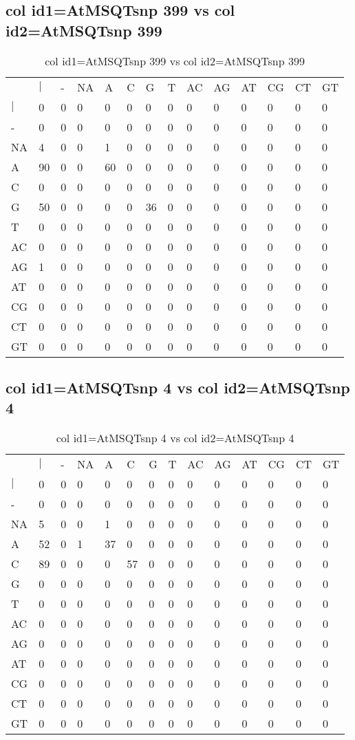 \subsection{col id1=AtMSQTsnp 399 vs col id2=AtMSQTsnp 399}
\begin{center}
\begin{longtable}{|l|l|l|l|l|l|l|l|l|l|l|l|l|l|}
\caption{col id1=AtMSQTsnp 399 vs col id2=AtMSQTsnp 399} \label{table_dm712}\\
\hline
\\
\hline
&$|$&-&NA&A&C&G&T&AC&AG&AT&CG&CT&GT\\
$|$&0&0&0&0&0&0&0&0&0&0&0&0&0\\
-&0&0&0&0&0&0&0&0&0&0&0&0&0\\
NA&4&0&0&1&0&0&0&0&0&0&0&0&0\\
A&90&0&0&60&0&0&0&0&0&0&0&0&0\\
C&0&0&0&0&0&0&0&0&0&0&0&0&0\\
G&50&0&0&0&0&36&0&0&0&0&0&0&0\\
T&0&0&0&0&0&0&0&0&0&0&0&0&0\\
AC&0&0&0&0&0&0&0&0&0&0&0&0&0\\
AG&1&0&0&0&0&0&0&0&0&0&0&0&0\\
AT&0&0&0&0&0&0&0&0&0&0&0&0&0\\
CG&0&0&0&0&0&0&0&0&0&0&0&0&0\\
CT&0&0&0&0&0&0&0&0&0&0&0&0&0\\
GT&0&0&0&0&0&0&0&0&0&0&0&0&0\\
\hline
\end{longtable}
\end{center}

\subsection{col id1=AtMSQTsnp 4 vs col id2=AtMSQTsnp 4}
\begin{center}
\begin{longtable}{|l|l|l|l|l|l|l|l|l|l|l|l|l|l|}
\caption{col id1=AtMSQTsnp 4 vs col id2=AtMSQTsnp 4} \label{table_dm714}\\
\hline
\\
\hline
&$|$&-&NA&A&C&G&T&AC&AG&AT&CG&CT&GT\\
$|$&0&0&0&0&0&0&0&0&0&0&0&0&0\\
-&0&0&0&0&0&0&0&0&0&0&0&0&0\\
NA&5&0&0&1&0&0&0&0&0&0&0&0&0\\
A&52&0&1&37&0&0&0&0&0&0&0&0&0\\
C&89&0&0&0&57&0&0&0&0&0&0&0&0\\
G&0&0&0&0&0&0&0&0&0&0&0&0&0\\
T&0&0&0&0&0&0&0&0&0&0&0&0&0\\
AC&0&0&0&0&0&0&0&0&0&0&0&0&0\\
AG&0&0&0&0&0&0&0&0&0&0&0&0&0\\
AT&0&0&0&0&0&0&0&0&0&0&0&0&0\\
CG&0&0&0&0&0&0&0&0&0&0&0&0&0\\
CT&0&0&0&0&0&0&0&0&0&0&0&0&0\\
GT&0&0&0&0&0&0&0&0&0&0&0&0&0\\
\hline
\end{longtable}
\end{center}

